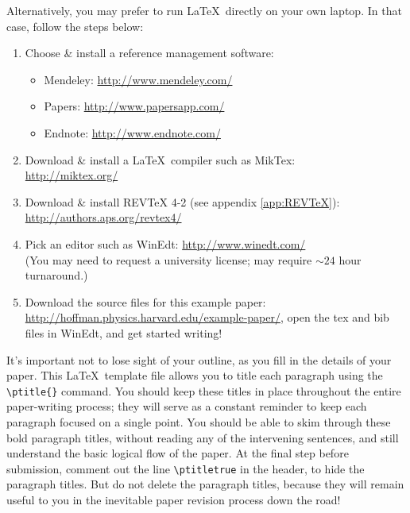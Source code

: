  Alternatively, you may prefer to run \LaTeX\ directly on your own laptop. In that case, follow the steps below:
\begin{raggedright}
\begin{enumerate}
\item Choose \& install a reference management software:
\begin{itemize}
\item Mendeley: \url{http://www.mendeley.com/}
\item Papers: \url{http://www.papersapp.com/}
\item Endnote: \url{http://www.endnote.com/}
\end{itemize}
\item Download \& install a \LaTeX\ compiler such as MikTex: \\
\url{http://miktex.org/}
\item Download \& install REVTeX 4-2 (see appendix \ref{app:REVTeX}):\\
\url{http://authors.aps.org/revtex4/}
\item Pick an editor such as WinEdt:
\url{http://www.winedt.com/}\\
(You may need to request a university license; may require $\sim 24$ hour turnaround.)
\item Download the source files for this example paper:
\url{http://hoffman.physics.harvard.edu/example-paper/}, open the tex and bib files in WinEdt, and get started writing!
\end{enumerate}
\end{raggedright}
\vspace{2mm}

 It's important not to lose sight of your outline, as you fill in the details of your paper. This \LaTeX\ template file allows you to title each paragraph using the {\tt \textbackslash ptitle\{\}} command. You should keep these titles in place throughout the entire paper-writing process; they will serve as a constant reminder to keep each paragraph focused on a single point. You should be able to skim through these bold paragraph titles, without reading any of the intervening sentences, and still understand the basic logical flow of the paper. At the final step before submission, comment out the line {\tt \textbackslash ptitletrue} in the header, to hide the paragraph titles. But do not delete the paragraph titles, because they will remain useful to you in the inevitable paper revision process down the road!

